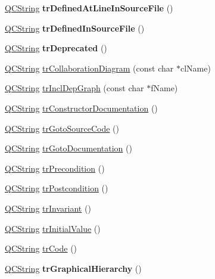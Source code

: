 \begin{DoxyCompactItemize}
\item 
\hypertarget{class_translator_polish_adc253b88ffe7628a37260627a8c0b29a}{\hyperlink{class_q_c_string}{Q\-C\-String} {\bfseries tr\-Defined\-At\-Line\-In\-Source\-File} ()}\label{class_translator_polish_adc253b88ffe7628a37260627a8c0b29a}

\item 
\hypertarget{class_translator_polish_aa11e744c82b96bf72abdf5edeed3ea55}{\hyperlink{class_q_c_string}{Q\-C\-String} {\bfseries tr\-Defined\-In\-Source\-File} ()}\label{class_translator_polish_aa11e744c82b96bf72abdf5edeed3ea55}

\item 
\hypertarget{class_translator_polish_ae6520e844a4d922882ef91f7598c792f}{\hyperlink{class_q_c_string}{Q\-C\-String} {\bfseries tr\-Deprecated} ()}\label{class_translator_polish_ae6520e844a4d922882ef91f7598c792f}

\item 
\hyperlink{class_q_c_string}{Q\-C\-String} \hyperlink{class_translator_polish_abdf1261377a3060749df99b6a28e38f4}{tr\-Collaboration\-Diagram} (const char $\ast$cl\-Name)
\item 
\hyperlink{class_q_c_string}{Q\-C\-String} \hyperlink{class_translator_polish_aa6d9df1b1ff80e60a9b96a593eb19cd6}{tr\-Incl\-Dep\-Graph} (const char $\ast$f\-Name)
\item 
\hyperlink{class_q_c_string}{Q\-C\-String} \hyperlink{class_translator_polish_aebd617a17c50cfbf8d1913f8512c609f}{tr\-Constructor\-Documentation} ()
\item 
\hyperlink{class_q_c_string}{Q\-C\-String} \hyperlink{class_translator_polish_a88de708e5c02579159f43d7eb122dc76}{tr\-Goto\-Source\-Code} ()
\item 
\hyperlink{class_q_c_string}{Q\-C\-String} \hyperlink{class_translator_polish_a5af78266c0a9774a0c8485691734746b}{tr\-Goto\-Documentation} ()
\item 
\hyperlink{class_q_c_string}{Q\-C\-String} \hyperlink{class_translator_polish_a012fba3db58cd80b7bfededef750329b}{tr\-Precondition} ()
\item 
\hyperlink{class_q_c_string}{Q\-C\-String} \hyperlink{class_translator_polish_a9e223ace863721b2c2a4254b1465d5ed}{tr\-Postcondition} ()
\item 
\hyperlink{class_q_c_string}{Q\-C\-String} \hyperlink{class_translator_polish_ae5f2fceb865e8a8772c5ee2b7cefc85b}{tr\-Invariant} ()
\item 
\hyperlink{class_q_c_string}{Q\-C\-String} \hyperlink{class_translator_polish_a79bb2ccb93ffb10fd595e96bc03fae7e}{tr\-Initial\-Value} ()
\item 
\hyperlink{class_q_c_string}{Q\-C\-String} \hyperlink{class_translator_polish_a16e9b5f97deae37b7f61d8785134e588}{tr\-Code} ()
\item 
\hypertarget{class_translator_polish_ae55585b4aa78c71c8c6e8dbd8955531c}{\hyperlink{class_q_c_string}{Q\-C\-String} {\bfseries tr\-Graphical\-Hierarchy} ()}\label{class_translator_polish_ae55585b4aa78c71c8c6e8dbd8955531c}


\end{DoxyCompactItemize}
